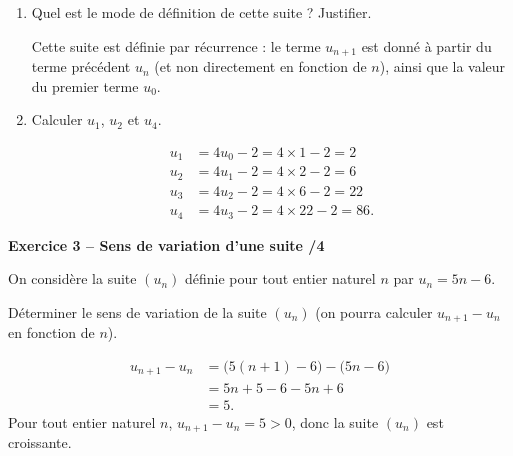 \documentclass[10pt,a4paper]{article}
\begin{document}
\begin{enumerate}
\item Quel est le mode de définition de cette suite ? Justifier.

Cette suite est définie par récurrence : le terme \(u_{n+1}\) est donné à partir du terme précédent \(u_n\) (et non directement en fonction de \(n\)), ainsi que la valeur du premier terme \(u_0\).

\item Calculer \(u_1\), \(u_2\) et \(u_4\).

\[
\begin{aligned}
u_1 &= 4u_0-2 = 4\times1-2 = 2\\
u_2 &= 4u_1-2 = 4\times2-2 = 6\\
u_3 &= 4u_2-2 = 4\times6-2 = 22\\
u_4 &= 4u_3-2 = 4\times22-2 = 86.
\end{aligned}
\]
\end{enumerate}

\textbf{Exercice 3 -- Sens de variation d'une suite \hfill /4}

On considère la suite \((u_n)\) définie pour tout entier naturel \(n\) par \(u_n=5n-6\).

Déterminer le sens de variation de la suite \((u_n)\) (on pourra calculer \(u_{n+1}-u_n\) en fonction de \(n\)).

\[
\begin{aligned}
u_{n+1}-u_n &= \bigl(5(n+1)-6\bigr)-\bigl(5n-6\bigr)\\
            &= 5n+5-6-5n+6\\
            &= 5.
\end{aligned}
\]
Pour tout entier naturel \(n\), \(u_{n+1}-u_n=5>0\), donc la suite \((u_n)\) est croissante.
\end{document}
